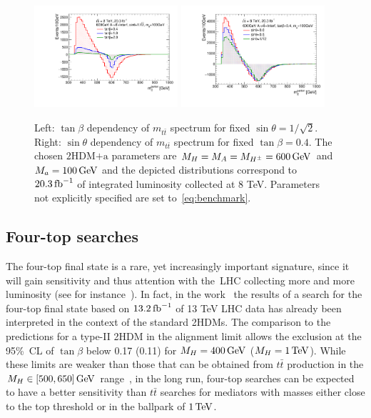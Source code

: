 \documentclass[a4paper, 11pt,notoc]{article}
\newcommand{\mA}{\ensuremath{M_{A}}\xspace}
\newcommand{\ma}{\ensuremath{M_{a}}\xspace}
\newcommand{\mH}{\ensuremath{M_{H}}\xspace}
\newcommand{\mHc}{\ensuremath{M_{H^{\pm}}}\xspace}
\newcommand{\hdma}{\ensuremath{\textrm{2HDM+a}}\xspace}
\begin{document}
\begin{figure}
\centering
\includegraphics[width=0.475\textwidth]{ttres_2HDMa_A_tanb.pdf} \quad 
\includegraphics[width=0.475\textwidth]{ttres_2HDMa_A_sinp.pdf}
\vspace{4mm}
\caption{Left: $\tan \beta$ dependency of $m_{t \bar t}$ spectrum for fixed $\sin \theta = 1/\sqrt{2}$. Right:  $\sin \theta$ dependency of $m_{t \bar t}$ spectrum for fixed $\tan \beta = 0.4$. The chosen \hdma parameters are $\mH=\mA=\mHc =600 \, {\rm GeV}$ and $\ma=100 \, {\rm GeV}$ and the depicted distributions correspond to $20.3 \, {\rm fb}^{-1}$ of integrated luminosity collected at 8 TeV. Parameters not explicitly specified are set to~\eqref{eq:benchmark}.}
\label{fig:ttres_2HDM_A}
\end{figure}

\subsection{Four-top searches}

The four-top final state is a rare, yet increasingly important signature, since it  will gain sensitivity and thus attention with the~LHC collecting more and more luminosity (see for instance~\cite{ATLAS-CONF-2016-104,Sirunyan:2017roi,Aaboud:2018xuw,Hajer:2015gka,Gori:2016zto,Alvarez:2016nrz}).  {\color{blue} In fact, in the work~\cite{ATLAS-CONF-2016-104} the results of a search for the four-top final state based on $13.2 \, {\rm fb}^{-1}$ of 13 TeV LHC data has already been interpreted in the context of the standard 2HDMs.} The comparison to the predictions for a type-II 2HDM in the alignment limit allows the exclusion at the 95\%~CL of $\tan \beta$  below 0.17 (0.11) for $\mH = 400 \, {\rm GeV}$ ($\mH = 1 \, {\rm TeV}$). {\color{blue} While these limits are weaker than those that can be obtained from $t \bar t$ production in the $M_{H} \in [500, 650] \, {\rm GeV}$ range~\cite{Aaboud:2017hnm}, in the long run, four-top searches can be expected to have a better sensitivity than $t \bar t$ searches for mediators with  masses either close to the top threshold or  in the ballpark of $1 \, {\rm TeV}$. }
\end{document}
